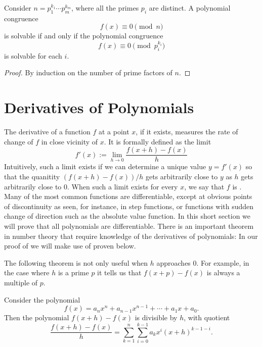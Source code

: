 \begin{corollary}
  Consider $n=p_1^{k_1}\cdots p_m^{k_m}$, where all the primes $p_i$ are distinct. A polynomial congruence
  \begin{equation*}
    f(x)\equiv 0 \pmod{n}
  \end{equation*}
  is solvable if and only if the polynomial congruence
  \begin{equation*}
    f(x)\equiv 0 \pmod{p_i^{k_i}}
  \end{equation*}
  is solvable for each $i$.
\end{corollary}

\begin{proof}
  By induction on the number of prime factors of $n$.
\end{proof}

\section{Derivatives of Polynomials}

The derivative of a function $f$ at a point $x$, if it exists, measures the rate of change of $f$ in close vicinity of $x$. It is formally defined as the limit
\begin{equation*}
  f'(x):=\lim_{h\to 0}\frac{f(x+h)-f(x)}{h}
\end{equation*}
Intuitively, such a limit exists if we can determine a unique value $y=f'(x)$ so that the quanitity $(f(x+h)-f(x))/h$ gets arbitrarily close to $y$ as $h$ gets arbitrarily close to $0$. When such a limit exists for every $x$, we say that $f$ is . Many of the most common functions are differentiable, except at obvious points of discontinuity as seen, for instance, in step functions, or functions with sudden change of direction such as the absolute value function. In this short section we will prove that all polynomials are differentiable. There is an important theorem in number theory that require knowledge of the derivatives of polynomials: In our proof of  we will make use of  proven below.

The following theorem is not only useful when $h$ approaches $0$. For example, in the case where $h$ is a prime $p$ it tells us that $f(x+p)-f(x)$ is always a multiple of $p$.

\begin{theorem}
  Consider the polynomial
  \begin{equation*}
    f(x)=a_nx^n+a_{n-1}x^{n-1}+\cdots+a_1x+a_0.
  \end{equation*}
  Then the polynomial $f(x+h)-f(x)$ is divisible by $h$, with quotient
  \begin{equation*}
    \frac{f(x+h)-f(x)}{h} = \sum_{k=1}^n\sum_{i=0}^{k-1}a_kx^i(x+h)^{k-1-i}.
  \end{equation*}
\end{theorem}

